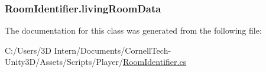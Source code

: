 \subsubsection[{\texorpdfstring{living\+Room\+Data}{livingRoomData}}]{ Room\+Identifier.\+living\+Room\+Data}\hypertarget{class_room_identifier_a8e148cd67699b89e8eafbb9abfd58734}{}\label{class_room_identifier_a8e148cd67699b89e8eafbb9abfd58734}


The documentation for this class was generated from the following file\+:\begin{DoxyCompactItemize}
\item 
C\+:/\+Users/3\+D Intern/\+Documents/\+Cornell\+Tech-\/\+Unity3\+D/\+Assets/\+Scripts/\+Player/\hyperlink{_room_identifier_8cs}{Room\+Identifier.\+cs}\end{DoxyCompactItemize}
